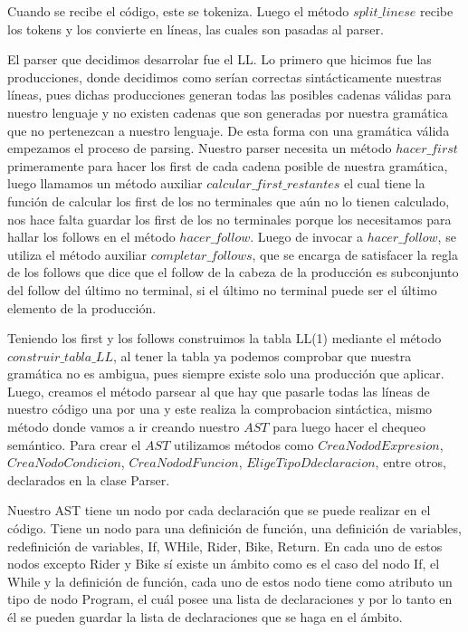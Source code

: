 \documentclass[12pt, letterpaper,spanish]{article}
\theoremstyle{definition}
\theoremstyle{remark}
\begin{document}
	Cuando se recibe el código, este se tokeniza. Luego el método $split\_linese$ recibe los tokens y los convierte en líneas, las cuales son pasadas al parser.
	
	El parser que decidimos desarrolar fue el LL. Lo primero que hicimos fue las producciones, donde decidimos como serían correctas
	sintácticamente nuestras líneas, pues dichas producciones generan todas las posibles cadenas válidas para nuestro lenguaje y no existen cadenas
	que son generadas por nuestra gramática que no pertenezcan a nuestro lenguaje. De esta forma con una gramática válida empezamos el proceso
	de parsing. Nuestro parser necesita un método $hacer\_first$ primeramente para hacer los first de cada cadena posible de nuestra gramática,
	luego llamamos un método auxiliar $calcular\_first\_restantes$ el cual tiene la función de calcular los first de los no terminales que aún
	no lo tienen calculado, nos hace falta guardar los first de los no terminales porque los necesitamos para hallar los follows en el método
	$hacer\_follow$. Luego de invocar a $hacer\_follow$, se utiliza el método auxiliar $completar\_follows$, que se encarga de satisfacer
	la regla de los follows que dice que el follow de la cabeza de la producción es subconjunto del follow del último no terminal, si el último no terminal puede ser el último elemento de la producción.
	
	Teniendo los first y los follows construimos la tabla LL(1) mediante el método $construir\_tabla\_LL$, al tener la tabla ya podemos comprobar que nuestra gramática no es ambigua, pues siempre existe solo una producción que aplicar. Luego, creamos el método parsear al que hay que pasarle	todas las líneas de nuestro código una por una y este realiza la comprobacion sintáctica, mismo método donde vamos a ir creando nuestro	$AST$ para luego hacer el chequeo semántico. Para crear el $AST$ utilizamos métodos como $CreaNododExpresion$, $CreaNodoCondicion$, $CreaNododFuncion$, $EligeTipoDdeclaracion$, entre otros, declarados en la clase Parser. 
	
	Nuestro AST tiene un nodo por cada declaración que se puede realizar en el código. Tiene un nodo para una definición de función, una 
	definición de variables, redefinición de variables, If, WHile, Rider, Bike, Return. En cada uno de estos nodos excepto Rider y Bike sí existe un ámbito como es el caso del nodo If, el While y la definición de función, cada uno de estos nodo tiene como atributo un tipo de nodo Program, el cuál posee una lista de declaraciones y por lo tanto en él se pueden guardar la lista de declaraciones que se haga en el ámbito.
	
\end{document}
